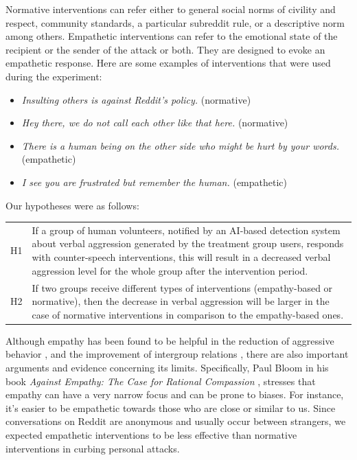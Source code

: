 \documentclass[preprint,12pt]{elsarticle}
\begin{document}
Normative interventions can refer either to general social norms of civility and respect, community standards, a particular subreddit rule, or a descriptive norm among others. Empathetic interventions can refer to the emotional state of the recipient or the sender of the attack or both. They are designed to evoke an empathetic response. Here are some examples of interventions that were used during the experiment: 

\begin{itemize}
  \item \emph{Insulting others is against Reddit's policy.} (normative)
  \item \emph{Hey there, we do not call each other like that here.} (normative)
  \item \emph{There is a human being on the other side who might be hurt by your words.} (empathetic)
  \item \emph{I see you are frustrated but remember the human.} (empathetic)
\end{itemize}

Our hypotheses were as follows: 

\vspace{2mm}

\begin{tabular}{lp{11cm}}
H1 & If a group of human volunteers, notified by an AI-based 
detection system about verbal aggression generated by the treatment group users, responds with counter-speech interventions, this will result in a decreased verbal aggression level for the whole group after the intervention period.\\
H2 &  If two groups receive different types of interventions (empathy-based or normative), then the decrease in verbal aggression will be larger in the case of normative interventions in comparison to the empathy-based ones. 
\end{tabular}


Although empathy has been found to be helpful in the reduction of aggressive behavior \citep{bjorkqvist2000social}, and the improvement of intergroup relations \citep{stephan1999role}, there are also important arguments and evidence concerning its limits. Specifically, Paul Bloom in his book \emph{Against Empathy: The Case for Rational Compassion} \citep{bloom2017against}, stresses that empathy can have a very narrow focus and can be prone to biases. For instance, it’s easier to be empathetic towards those who are close or similar to us. Since conversations on Reddit are anonymous and usually occur between strangers, we expected  empathetic interventions to  be less effective than normative interventions in curbing personal attacks.
\end{document}

